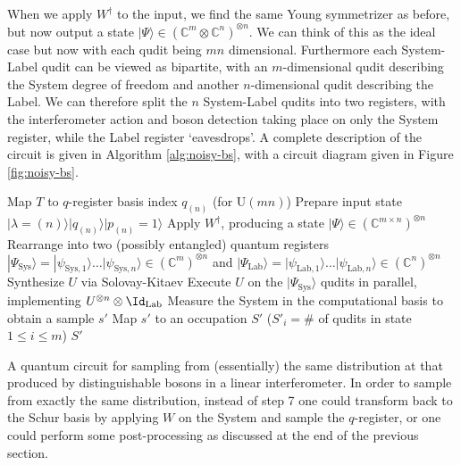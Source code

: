 When we apply $W^\dagger$ to the input, we find the same Young symmetrizer as before, but now output a state $|\Psi\rangle \in (\mathbb{C}^m\otimes\mathbb{C}^n)^{\otimes n}$. 
We can think of this as the ideal case but now with each qudit being $mn$ dimensional.
Furthermore each System-Label qudit can be viewed as bipartite, with an $m$-dimensional qudit describing the System degree of freedom and another $n$-dimensional qudit describing the Label. 
We can therefore split the $n$ System-Label qudits into two registers, with the interferometer action and boson detection taking place on only the System register, while the Label register `eavesdrops'.
A complete description of the circuit is given in Algorithm \ref{alg:noisy-bs}, with a circuit diagram given in Figure \ref{fig:noisy-bs}.
\begin{algorithm}
\BlankLine
Map $T$ to $q$-register basis index $q_{(n)}$ (for U$(mn)$)\;
Prepare input state $|\lambda=(n)\rangle|q_{(n)}\rangle|p_{(n)}=1\rangle$\;
Apply $W^\dagger$, producing a state $|\Psi\rangle \in (\mathbb{C}^{m \times n})^{\otimes n}$\;
Rearrange into two (possibly entangled) quantum registers $|\Psi_{\textrm{Sys}}\rangle = |\psi_{\textrm{Sys}, 1}\rangle\dots|\psi_{\textrm{Sys}, n}\rangle \in (\mathbb{C}^m)^{\otimes n}$ and $|\Psi_{\textrm{Lab}}\rangle = |\psi_{\textrm{Lab}, 1}\rangle\dots|\psi_{\textrm{Lab}, n}\rangle \in (\mathbb{C}^{n})^{\otimes n}$\;
Synthesize $U$ via Solovay-Kitaev\;
Execute $U$ on the $|\Psi_{\textrm{Sys}}\rangle$ qudits in parallel, implementing  $U^{\otimes n} \otimes \Id_\mathrm{Lab}$\;
Measure the System in the computational basis to obtain a sample $s'$\;
Map $s'$ to an occupation $S'$ ($S'_i = \#$ of qudits in state $1\leq i\leq m$)\;
\Return $S'$
\caption[A quantum circuit for sampling from (essentially) the same distribution at that produced by distinguishable bosons in a linear interferometer]{A quantum circuit for sampling from (essentially) the same distribution at that produced by distinguishable bosons in a linear interferometer.
In order to sample from exactly the same distribution, instead of step 7 one could transform back to the Schur basis by applying $W$ on the System and sample the $q$-register, or one could perform some post-processing as discussed at the end of the previous section.}
\label{alg:noisy-bs}
\end{algorithm}

